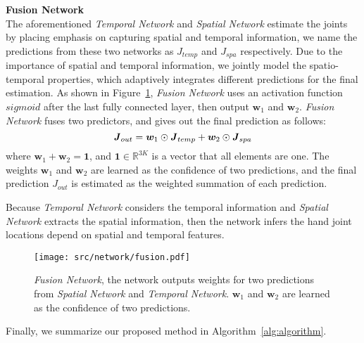\documentclass[journal,comsoc]{IEEEtran}
\let\MYoriglatexcaption\caption
\renewcommand{\caption}[2][\relax]{\MYoriglatexcaption[#2]{#2}}
\def \J{\bm{\mathit{J}}}
\begin{document}
\noindent \textbf{Fusion Network}\vspace{0.5em}\label{sec:fusion network}\\
\indent The aforementioned \emph{Temporal Network} and \emph{Spatial Network} estimate the joints by placing emphasis on
capturing spatial and temporal information, we name the predictions from these two networks as $\J_{temp}$ and $\J_{spa}$ respectively.
Due to the importance of spatial and temporal information, we jointly model the spatio-temporal properties,
which adaptively integrates different predictions for the final estimation. As shown in Figure~\ref{fig:fusion},
\emph{Fusion Network} uses an activation function $sigmoid$ after the last fully connected layer, then output $\bm{w}_1$ and $\bm{w}_2$.
\emph{Fusion Network} fuses two predictors, and gives out the final prediction as follows:
\begin{equation}\label{eq:Fusion Network}
\centering
\J_{out} = \bm{w}_1 \odot \J_{temp} + \bm{w}_2 \odot \J_{spa}
\end{equation}
where $\bm{w}_1 + \bm{w}_2 = \bm{1}$, and $\bm{1} \in \mathbb{R}^{3K}$ is a vector that all elements are one.
The weights $\bm{w}_1$ and $\bm{w}_2$ are learned as the confidence of two predictions, and the final prediction $\J_{out}$
is estimated as the weighted summation of each prediction.

Because \emph{Temporal Network} considers the temporal information and \emph{Spatial Network} extracts
the spatial information, then the network infers the hand joint locations depend on spatial and temporal features.

\begin{figure}[t]\footnotesize
\centering
    \texttt{[image: src/network/fusion.pdf]}
    \caption{\emph{Fusion Network}, the network outputs weights for two predictions from \emph{Spatial Network}
    and \emph{Temporal Network}. $\bm{w}_1$ and $\bm{w}_2$ are learned as the confidence of two predictions.}
\label{fig:fusion}
\end{figure}

Finally, we summarize our proposed method in Algorithm~\ref{alg:algorithm}.
\end{document}
